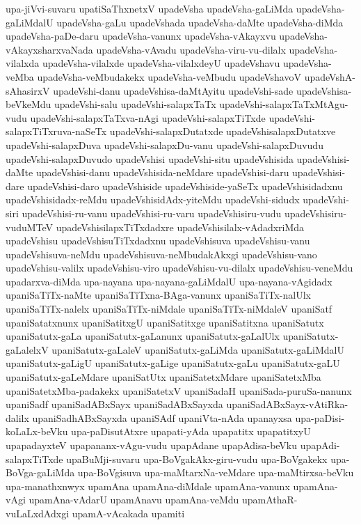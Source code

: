 {upa-jiVvi-suvaru
upatiSaThxnetxV
upadeVsha
upadeVsha-gaLiMda
upadeVsha-gaLiMdalU
upadeVsha-gaLu
upadeVshada
upadeVsha-daMte
upadeVsha-diMda
upadeVsha-paDe-daru
upadeVsha-vanunx
upadeVsha-vAkayxvu
upadeVsha-vAkayxsharxvaNada
upadeVsha-vAvadu
upadeVsha-viru-vu-dilalx
upadeVsha-vilalxda
upadeVsha-vilalxde
upadeVsha-vilalxdeyU
upadeVshavu
upadeVsha-veMba
upadeVsha-veMbudakekx
upadeVsha-veMbudu
upadeVshavoV
upadeVshA-sAhasirxV
upadeVshi-danu
upadeVshisa-daMtAyitu
upadeVshi-sade
upadeVshisa-beVkeMdu
upadeVshi-salu
upadeVshi-salapxTaTx
upadeVshi-salapxTaTxMtAgu-vudu
upadeVshi-salapxTaTxva-nAgi
upadeVshi-salapxTiTxde
upadeVshi-salapxTiTxruva-naSeTx
upadeVshi-salapxDutatxde
upadeVshisalapxDutatxve
upadeVshi-salapxDuva
upadeVshi-salapxDu-vanu
upadeVshi-salapxDuvudu
upadeVshi-salapxDuvudo
upadeVshisi
upadeVshi-situ
upadeVshisida
upadeVshisi-daMte
upadeVshisi-danu
upadeVshisida-neMdare
upadeVshisi-daru
upadeVshisi-dare
upadeVshisi-daro
upadeVshiside
upadeVshiside-yaSeTx
upadeVshisidadxnu
upadeVshisidadx-reMdu
upadeVshisidAdx-yiteMdu
upadeVshi-sidudx
upadeVshi-siri
upadeVshisi-ru-vanu
upadeVshisi-ru-varu
upadeVshisiru-vudu
upadeVshisiru-vuduMTeV
upadeVshisilapxTiTxdadxre
upadeVshisilalx-vAdadxriMda
upadeVshisu
upadeVshisuTiTxdadxnu
upadeVshisuva
upadeVshisu-vanu
upadeVshisuva-neMdu
upadeVshisuva-neMbudakAkxgi
upadeVshisu-vano
upadeVshisu-valilx
upadeVshisu-viro
upadeVshisu-vu-dilalx
upadeVshisu-veneMdu
upadarxva-diMda
upa-nayana
upa-nayana-gaLiMdalU
upa-nayana-vAgidadx
upaniSaTiTx-naMte
upaniSaTiTxna-BAga-vanunx
upaniSaTiTx-nalUlx
upaniSaTiTx-nalelx
upaniSaTiTx-niMdale
upaniSaTiTx-niMdaleV
upaniSatf
upaniSatatxnunx
upaniSatitxgU
upaniSatitxge
upaniSatitxna
upaniSatutx
upaniSatutx-gaLa
upaniSatutx-gaLanunx
upaniSatutx-gaLalUlx
upaniSatutx-gaLalelxV
upaniSatutx-gaLaleV
upaniSatutx-gaLiMda
upaniSatutx-gaLiMdalU
upaniSatutx-gaLigU
upaniSatutx-gaLige
upaniSatutx-gaLu
upaniSatutx-gaLU
upaniSatutx-gaLeMdare
upaniSatUtx
upaniSatetxMdare
upaniSatetxMba
upaniSatetxMba-padakekx
upaniSatetxV
upaniSadaH
upaniSada-puruSa-nanunx
upaniSadf
upaniSadABxSayx
upaniSadABxSayxda
upaniSadABxSayx-vAtiRka-dalilx
upaniSadhABxSayxda
upaniSAdf
upaniVta-nAda
upanayxsa
upa-paDisi-koLaLx-beVku
upa-paDisutAtxre
upapati-yAda
upapatitx
upapatitxyU
upapadayxteV
upapananx-vAgu-vudu
upapAdane
upapAdisa-beVku
upapAdi-salapxTiTxde
upaBuMji-suvaru
upa-BoVgakAkx-giru-vudu
upa-BoVgakekx
upa-BoVga-gaLiMda
upa-BoVgisuva
upa-maMtarxNa-veMdare
upa-maMtirxsa-beVku
upa-manathxnwyx
upamAna
upamAna-diMdale
upamAna-vanunx
upamAna-vAgi
upamAna-vAdarU
upamAnavu
upamAna-veMdu
upamAthaR-vuLaLxdAdxgi
upamA-vAcakada
upamiti
}
